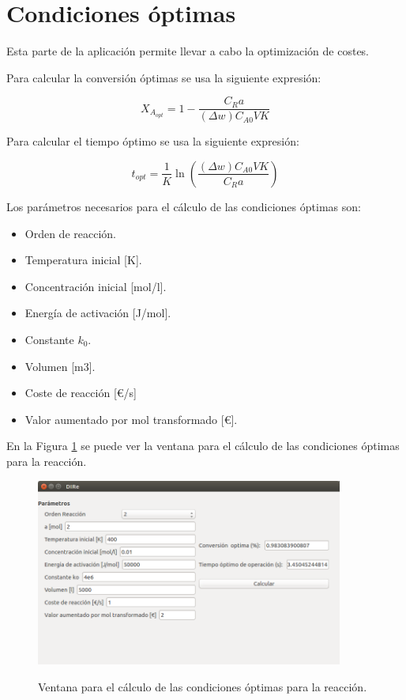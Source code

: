 	\section{Condiciones óptimas}
	Esta parte de la aplicación permite llevar a cabo la optimización de costes.
	
	
	Para calcular la conversión óptimas se usa la siguiente expresión:
	
	\begin{equation*}
		X_{A_{opt}} = 1- \frac{C_Ra}{(\Delta w) C_{A0}VK}
	\end{equation*}
	
	Para calcular el tiempo óptimo se usa la siguiente expresión:
	
	\begin{equation*}
		t_{opt} = \frac{1}{K}\ln \left(\frac{(\Delta w) C_{A0}VK}{C_Ra}\right)
	\end{equation*}
	
	Los parámetros necesarios para el cálculo de las condiciones óptimas son:
	
	\begin{itemize}
		\item Orden de reacción.
		\item Temperatura inicial [K].
		\item Concentración inicial [mol/l].
		\item Energía de activación [J/mol].
		\item Constante $k_0$.
		\item Volumen [m3].
		\item Coste de reacción [€/s]
		\item Valor aumentado por mol transformado [€].
	\end{itemize}
	
	En la Figura \ref{con_op} se puede ver la ventana para el cálculo de las condiciones
	óptimas para la reacción.

	\begin{figure}[!h]
		\centering
		\includegraphics[width=0.9\textwidth]{./imagenes/reactor_discontinuo/con_op.png}
		\label{con_op}
		\caption{Ventana para el cálculo de las condiciones óptimas para la reacción.}
	\end{figure}

	